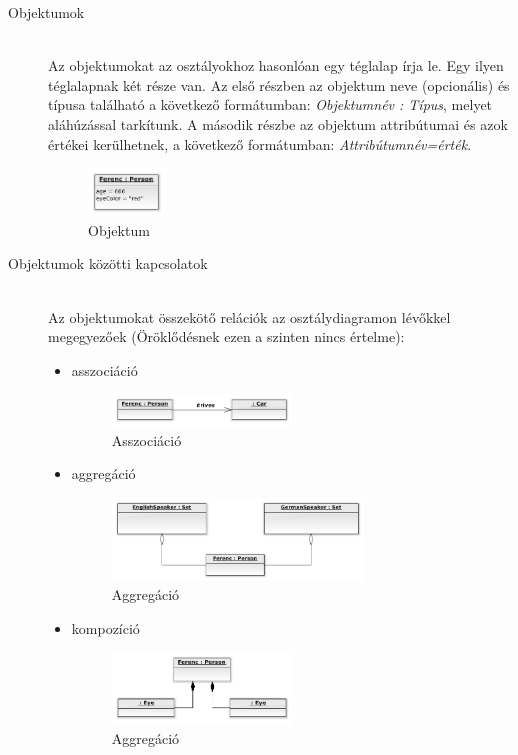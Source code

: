 \documentclass[margin=0px]{article}
\begin{document}
			\begin{description}
				\item[Objektumok] \hfill \\
					Az objektumokat az osztályokhoz hasonlóan egy téglalap írja le. Egy ilyen téglalapnak két része van. Az első részben az objektum neve (opcionális) és típusa található a következő formátumban: \textit{Objektumnév : Típus}, melyet aláhúzással tarkítunk. A második részbe az objektum attribútumai és azok értékei kerülhetnek, a következő formátumban: \textit{Attribútumnév=érték}.
						\begin{figure}[H]
							\centering
							\includegraphics[width=0.2\textwidth]{img/objektum.png}
							\caption{Objektum}
						\end{figure}
				\item[Objektumok közötti kapcsolatok] \hfill \\
					Az objektumokat összekötő relációk az osztálydiagramon lévőkkel megegyezőek (Öröklődésnek ezen a szinten nincs értelme):
						\begin{itemize}
							\item asszociáció
								\begin{figure}[H]
									\centering
									\includegraphics[width=0.5\textwidth]{img/asszociacio2.png}
									\caption{Asszociáció}
								\end{figure}
							\item aggregáció
								\begin{figure}[H]
									\centering
									\includegraphics[width=0.7\textwidth]{img/aggregacio2.png}
									\caption{Aggregáció}
								\end{figure}
							\item kompozíció
								\begin{figure}[H]
									\centering
									\includegraphics[width=0.5\textwidth]{img/kompozicio2.png}
									\caption{Aggregáció}
								\end{figure}
						\end{itemize}
			\end{description}
\end{document}

